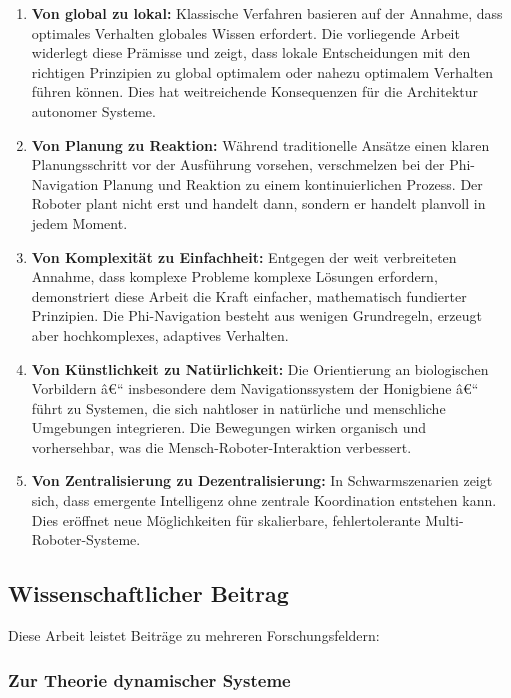 ﻿\documentclass[a4paper,12pt]{article}
\theoremstyle{definition}
\begin{document}
\begin{enumerate}
	\item \textbf{Von global zu lokal:} Klassische Verfahren basieren auf der Annahme, dass optimales Verhalten globales Wissen erfordert. Die vorliegende Arbeit widerlegt diese Prämisse und zeigt, dass lokale Entscheidungen mit den richtigen Prinzipien zu global optimalem oder nahezu optimalem Verhalten führen können. Dies hat weitreichende Konsequenzen für die Architektur autonomer Systeme.
	
	\item \textbf{Von Planung zu Reaktion:} Während traditionelle Ansätze einen klaren Planungsschritt vor der Ausführung vorsehen, verschmelzen bei der Phi-Navigation Planung und Reaktion zu einem kontinuierlichen Prozess. Der Roboter plant nicht erst und handelt dann, sondern er handelt planvoll in jedem Moment.
	
	\item \textbf{Von Komplexität zu Einfachheit:} Entgegen der weit verbreiteten Annahme, dass komplexe Probleme komplexe Lösungen erfordern, demonstriert diese Arbeit die Kraft einfacher, mathematisch fundierter Prinzipien. Die Phi-Navigation besteht aus wenigen Grundregeln, erzeugt aber hochkomplexes, adaptives Verhalten.
	
	\item \textbf{Von Künstlichkeit zu Natürlichkeit:} Die Orientierung an biologischen Vorbildern â€“ insbesondere dem Navigationssystem der Honigbiene â€“ führt zu Systemen, die sich nahtloser in natürliche und menschliche Umgebungen integrieren. Die Bewegungen wirken organisch und vorhersehbar, was die Mensch-Roboter-Interaktion verbessert.
	
	\item \textbf{Von Zentralisierung zu Dezentralisierung:} In Schwarmszenarien zeigt sich, dass emergente Intelligenz ohne zentrale Koordination entstehen kann. Dies eröffnet neue Möglichkeiten für skalierbare, fehlertolerante Multi-Roboter-Systeme.
\end{enumerate}

\subsection{Wissenschaftlicher Beitrag}

Diese Arbeit leistet Beiträge zu mehreren Forschungsfeldern:

\subsubsection{Zur Theorie dynamischer Systeme}
\end{document}

